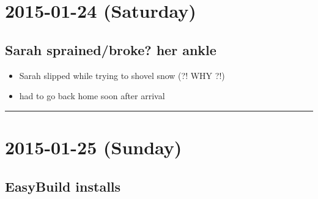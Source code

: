 \documentclass[letterpaper]{scrartcl}
\begin{document}
\section{2015-01-24 (Saturday)}\label{saturday-2}

\subsection{Sarah sprained/broke? her
ankle}\label{sarah-sprainedbroke-her-ankle}

\begin{itemize}
\itemsep1pt\parskip0pt
\item
  Sarah slipped while trying to shovel snow (?! WHY ?!)
\item
  had to go back home soon after arrival
\end{itemize}

\begin{center}\rule{0.5\linewidth}{\linethickness}\end{center}

\section{2015-01-25 (Sunday)}\label{sunday-2}

\subsection{EasyBuild installs}\label{easybuild-installs-3}
\end{document}

